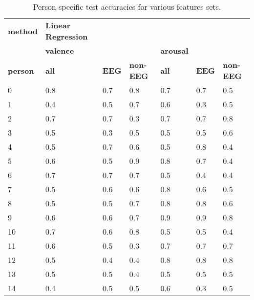 \begin{table}[]
\centering
\caption{Person specific test accuracies for various features sets.}
\begin{tabular}{l|lll|lll}
\textbf{method}          & \textbf{Linear Regression}    &           &         &         &     &         \\
                & \textbf{valence}              &           &         & \textbf{arousal} &     &         \\
\textbf{person}          & \textbf{all}                  & \textbf{EEG}       & \textbf{non-EEG} & \textbf{all}     & \textbf{EEG} & \textbf{non-EEG} \\ \hline 
 0               & 0.8                  & 0.7       & 0.8     & 0.7     & 0.7 & 0.5     \\
1               & 0.4                  & 0.5       & 0.7     & 0.6     & 0.3 & 0.5     \\
2               & 0.7                  & 0.7       & 0.3     & 0.7     & 0.7 & 0.8     \\
3               & 0.5                  & 0.3       & 0.5     & 0.5     & 0.5 & 0.6     \\
4               & 0.5                  & 0.7       & 0.6     & 0.5     & 0.8 & 0.4     \\
5               & 0.6                  & 0.5       & 0.9     & 0.8     & 0.7 & 0.4     \\
6               & 0.7                  & 0.7       & 0.7     & 0.5     & 0.4 & 0.4     \\
7               & 0.5                  & 0.6       & 0.6     & 0.8     & 0.6 & 0.5     \\
8               & 0.5                  & 0.5       & 0.7     & 0.8     & 0.8 & 0.6     \\
9               & 0.6                  & 0.6       & 0.7     & 0.9     & 0.9 & 0.8     \\
10              & 0.7                  & 0.6       & 0.8     & 0.5     & 0.5 & 0.4     \\
11              & 0.6                  & 0.5       & 0.3     & 0.7     & 0.7 & 0.7     \\
12              & 0.5                  & 0.4       & 0.4     & 0.8     & 0.8 & 0.8     \\
13              & 0.5                  & 0.5       & 0.4     & 0.5     & 0.5 & 0.5     \\
14              & 0.4                  & 0.5       & 0.5     & 0.6     & 0.3 & 0.5     \\

\end{tabular}
\end{table}
